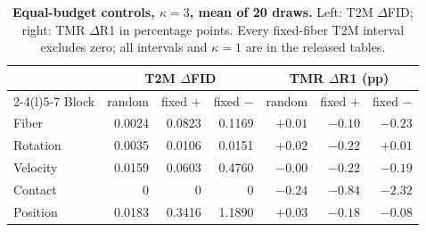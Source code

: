 \begin{table}[t]\centering\footnotesize\setlength{\tabcolsep}{3.2pt}
\caption{\textbf{Equal-budget controls, $\kappa=3$, mean of 20 draws.} Left: T2M $\Delta$FID; right: TMR $\Delta$R1 in percentage points. Every fixed-fiber T2M interval excludes zero; all intervals and $\kappa=1$ are in the released tables.}\label{tab:budget}
\begin{tabular}{@{}lrrrrrr@{}}\toprule
&\multicolumn{3}{c}{T2M $\Delta$FID}&\multicolumn{3}{c}{TMR $\Delta$R1 (pp)}\\
\cmidrule(lr){2-4}\cmidrule(l){5-7}
Block&random&fixed $+$&fixed $-$&random&fixed $+$&fixed $-$\\\midrule
Fiber&0.0024&0.0823&0.1169&$+0.01$&$-0.10$&$-0.23$\\
Rotation&0.0035&0.0106&0.0151&$+0.02$&$-0.22$&$+0.01$\\
Velocity&0.0159&0.0603&0.4760&$-0.00$&$-0.22$&$-0.19$\\
Contact&0&0&0&$-0.24$&$-0.84$&$-2.32$\\
Position&0.0183&0.3416&1.1890&$+0.03$&$-0.18$&$-0.08$\\
\bottomrule\end{tabular}\end{table}
